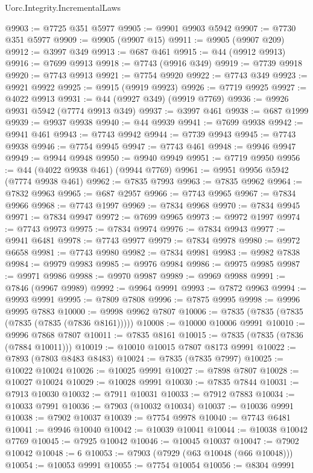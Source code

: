 \begin{lexlean}{Uorc.Integrity.IncrementalLaws}
\begin{coremodule}
@9903 := @7725 @351 @5977
@9905 := @9901 @9903 @5942
@9907 := @7730 @351 @5977
@9909 := @9905 (@9907 @15)
@9911 := @9905 (@9907 @209)
@9912 := @3997 @349
@9913 := @687 @461
@9915 := @44 (@9912 @9913)
@9916 := @7699 @9913
@9918 := @7743 (@9916 @349)
@9919 := @7739 @9918
@9920 := @7743 @9913
@9921 := @7754 @9920
@9922 := @7743 @349
@9923 := @9921 @9922
@9925 := @9915 (@9919 @9923)
@9926 := @7719 @9925
@9927 := @4022 @9913
@9931 := @44 (@9927 @349) (@9919 @7769)
@9936 := @9926 @9931 @5942 (@7774 @9913 @349)
@9937 := @3997 @461
@9938 := @687 @1999
@9939 := @9937 @9938
@9940 := @44 @9939
@9941 := @7699 @9938
@9942 := @9941 @461
@9943 := @7743 @9942
@9944 := @7739 @9943
@9945 := @7743 @9938
@9946 := @7754 @9945
@9947 := @7743 @461
@9948 := @9946 @9947
@9949 := @9944 @9948
@9950 := @9940 @9949
@9951 := @7719 @9950
@9956 := @44 (@4022 @9938 @461) (@9944 @7769)
@9961 := @9951 @9956 @5942 (@7774 @9938 @461)
@9962 := @7835 @7993
@9963 := @7835 @9962
@9964 := @7832 @9963
@9965 := @687 @2957
@9966 := @7743 @9965
@9967 := @7834 @9966
@9968 := @7743 @1997
@9969 := @7834 @9968
@9970 := @7834 @9945
@9971 := @7834 @9947
@9972 := @7699 @9965
@9973 := @9972 @1997
@9974 := @7743 @9973
@9975 := @7834 @9974
@9976 := @7834 @9943
@9977 := @9941 @6481
@9978 := @7743 @9977
@9979 := @7834 @9978
@9980 := @9972 @6658
@9981 := @7743 @9980
@9982 := @7834 @9981
@9983 := @9982 @7838
@9984 := @9979 @9983
@9985 := @9976 @9984
@9986 := @9975 @9985
@9987 := @9971 @9986
@9988 := @9970 @9987
@9989 := @9969 @9988
@9991 := @7846 (@9967 @9989)
@9992 := @9964 @9991
@9993 := @7872 @9963
@9994 := @9993 @9991
@9995 := @7809 @7808
@9996 := @7875 @9995
@9998 := @9996 @9995 @7883
@10000 := @9998 @9962 @7807
@10006 := @7835 (@7835 (@7835 (@7835 (@7835 (@7836 @8161)))))
@10008 := @10000 @10006 @9991
@10010 := @9996 @7868 @7807
@10011 := @7835 @8161
@10015 := @7835 (@7835 (@7836 (@7884 @10011)))
@10019 := @10010 @10015 @7807 @8173 @9991
@10022 := @7893 (@7803 @8483 @8483)
@10024 := @7835 (@7835 @7997)
@10025 := @10022 @10024
@10026 := @10025 @9991
@10027 := @7898 @7807
@10028 := @10027 @10024
@10029 := @10028 @9991
@10030 := @7835 @7844
@10031 := @7913 @10030
@10032 := @7911 @10031
@10033 := @7912 @7883
@10034 := @10033 @7991
@10036 := @7903 (@10032 @10034)
@10037 := @10036 @9991
@10038 := @7902 @10037
@10039 := @7754 @9978
@10040 := @7743 @6481
@10041 := @9946 @10040
@10042 := @10039 @10041
@10044 := @10038 @10042 @7769
@10045 := @7925 @10042
@10046 := @10045 @10037
@10047 := @7902 @10042
@10048 := 6
@10053 := @7903 (@7929 (@63 @10048 (@66 @10048)))
@10054 := @10053 @9991
@10055 := @7754 @10054
@10056 := @8304 @9991

\end{coremodule}
\end{lexlean}
